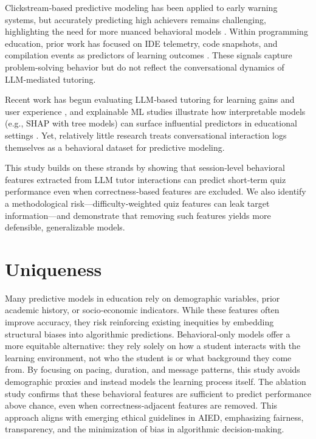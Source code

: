 \documentclass[conference]{IEEEtran}
\begin{document}
Clickstream‑based predictive modeling has been applied to early warning systems, but accurately predicting high achievers remains challenging, highlighting the need for more nuanced behavioral models \cite{borna2024, tang2025multiverse}. Within programming education, prior work has focused on IDE telemetry, code snapshots, and compilation events as predictors of learning outcomes \cite{piech2015deep, rivers2017automated}. These signals capture problem‑solving behavior but do not reflect the conversational dynamics of LLM‑mediated tutoring.

Recent work has begun evaluating LLM‑based tutoring for learning gains and user experience \cite{kasneci2023chatgpt}, and explainable ML studies illustrate how interpretable models (e.g., SHAP with tree models) can surface influential predictors in educational settings \cite{info16090763}. Yet, relatively little research treats conversational interaction logs themselves as a behavioral dataset for predictive modeling.

This study builds on these strands by showing that session‑level behavioral features extracted from LLM tutor interactions can predict short‑term quiz performance even when correctness‑based features are excluded. We also identify a methodological risk—difficulty‑weighted quiz features can leak target information—and demonstrate that removing such features yields more defensible, generalizable models.


\section{Uniqueness}

Many predictive models in education rely on demographic variables, prior academic history, or socio‑economic indicators. While these features often improve accuracy, they risk reinforcing existing inequities by embedding structural biases into algorithmic predictions. Behavioral‑only models offer a more equitable alternative: they rely solely on how a student interacts with the learning environment, not who the student is or what background they come from. By focusing on pacing, duration, and message patterns, this study avoids demographic proxies and instead models the learning process itself. The ablation study confirms that these behavioral features are sufficient to predict performance above chance, even when correctness‑adjacent features are removed. This approach aligns with emerging ethical guidelines in AIED, emphasizing fairness, transparency, and the minimization of bias in algorithmic decision‑making.
\end{document}
